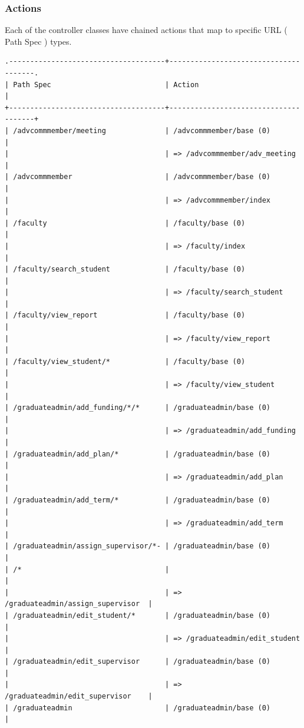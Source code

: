 \documentclass{journal}
\begin{document}
\subsubsection{Actions}
Each of the controller classes have chained actions that map to specific URL ( Path Spec ) types. 

\begin{verbatim}
.-------------------------------------+--------------------------------------.
| Path Spec                           | Action                               |
+-------------------------------------+--------------------------------------+
| /advcommmember/meeting              | /advcommmember/base (0)              |
|                                     | => /advcommmember/adv_meeting        |
| /advcommmember                      | /advcommmember/base (0)              |
|                                     | => /advcommmember/index              |
| /faculty                            | /faculty/base (0)                    |
|                                     | => /faculty/index                    |
| /faculty/search_student             | /faculty/base (0)                    |
|                                     | => /faculty/search_student           |
| /faculty/view_report                | /faculty/base (0)                    |
|                                     | => /faculty/view_report              |
| /faculty/view_student/*             | /faculty/base (0)                    |
|                                     | => /faculty/view_student             |
| /graduateadmin/add_funding/*/*      | /graduateadmin/base (0)              |
|                                     | => /graduateadmin/add_funding        |
| /graduateadmin/add_plan/*           | /graduateadmin/base (0)              |
|                                     | => /graduateadmin/add_plan           |
| /graduateadmin/add_term/*           | /graduateadmin/base (0)              |
|                                     | => /graduateadmin/add_term           |
| /graduateadmin/assign_supervisor/*- | /graduateadmin/base (0)              |
| /*                                  |                                      |
|                                     | => /graduateadmin/assign_supervisor  |
| /graduateadmin/edit_student/*       | /graduateadmin/base (0)              |
|                                     | => /graduateadmin/edit_student       |
| /graduateadmin/edit_supervisor      | /graduateadmin/base (0)              |
|                                     | => /graduateadmin/edit_supervisor    |
| /graduateadmin                      | /graduateadmin/base (0)              |

\end{verbatim}
\end{document}
